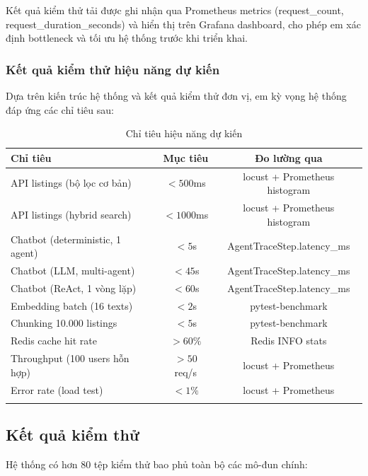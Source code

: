 Kết quả kiểm thử tải được ghi nhận qua Prometheus metrics (request\_count, request\_duration\_seconds) và hiển thị trên Grafana dashboard, cho phép em xác định bottleneck và tối ưu hệ thống trước khi triển khai.

\subsubsection*{Kết quả kiểm thử hiệu năng dự kiến}

Dựa trên kiến trúc hệ thống và kết quả kiểm thử đơn vị, em kỳ vọng hệ thống đáp ứng các chỉ tiêu sau:

\begin{longtable}{|p{5cm}|c|c|}
    \hline
    \textbf{Chỉ tiêu} & \textbf{Mục tiêu} & \textbf{Đo lường qua} \\
    \hline
    API listings (bộ lọc cơ bản) & $<500$ms & locust + Prometheus histogram \\
    \hline
    API listings (hybrid search) & $<1000$ms & locust + Prometheus histogram \\
    \hline
    Chatbot (deterministic, 1 agent) & $<5$s & AgentTraceStep.latency\_ms \\
    \hline
    Chatbot (LLM, multi-agent) & $<45$s & AgentTraceStep.latency\_ms \\
    \hline
    Chatbot (ReAct, 1 vòng lặp) & $<60$s & AgentTraceStep.latency\_ms \\
    \hline
    Embedding batch (16 texts) & $<2$s & pytest-benchmark \\
    \hline
    Chunking 10.000 listings & $<5$s & pytest-benchmark \\
    \hline
    Redis cache hit rate & $>60\%$ & Redis INFO stats \\
    \hline
    Throughput (100 users hỗn hợp) & $>50$ req/s & locust + Prometheus \\
    \hline
    Error rate (load test) & $<1\%$ & locust + Prometheus \\
    \hline
    \caption{Chỉ tiêu hiệu năng dự kiến}
    \label{tab:perf-targets}
\end{longtable}

\subsection{Kết quả kiểm thử}

Hệ thống có hơn 80 tệp kiểm thử bao phủ toàn bộ các mô-đun chính:

